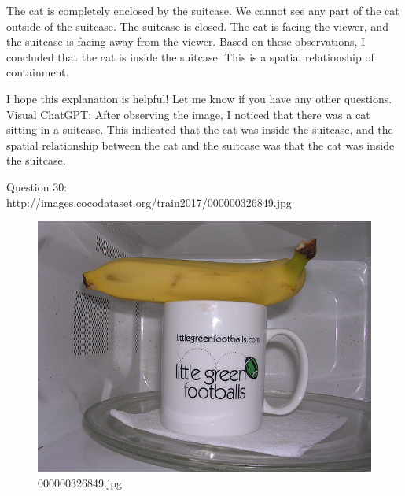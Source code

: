 \begin{enumerate}
        The cat is completely enclosed by the suitcase.
        We cannot see any part of the cat outside of the suitcase.
        The suitcase is closed.
        The cat is facing the viewer, and the suitcase is facing away from the viewer.
        Based on these observations, I concluded that the cat is inside the suitcase. This is a spatial relationship of containment.
        
        I hope this explanation is helpful! Let me know if you have any other questions.
        \subitem Visual ChatGPT: After observing the image, I noticed that there was a cat sitting in a suitcase. This indicated that the cat was inside the suitcase, and the spatial relationship between the cat and the suitcase was that the cat was inside the suitcase.
    \end{enumerate}
    Question 30:\\http://images.cocodataset.org/train2017/000000326849.jpg
    \begin{figure}[h]
        \centering
        \includegraphics[width=0.8\linewidth]{../image set/easy/000000326849.jpg}
        \caption{000000326849.jpg}
    \end{figure}

